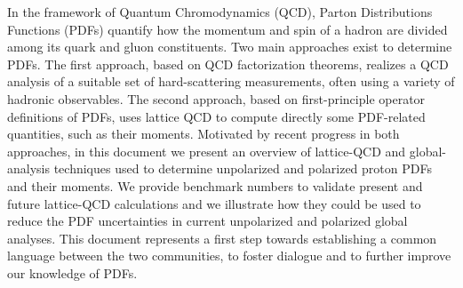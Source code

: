 \documentclass[twoside,12pt]{article}
\numberwithin{equation}{section}
\numberwithin{figure}{section}
\numberwithin{table}{section}
\begin{document}
\vspace{-0.4cm}
In the framework of Quantum Chromodynamics (QCD), Parton Distributions 
Functions (PDFs) quantify how the momentum and spin of a hadron are divided 
among its quark and gluon constituents.
%
Two main approaches exist to determine PDFs.
%
The first approach, based on QCD factorization theorems, realizes a QCD 
analysis of a suitable set of hard-scattering measurements, often using a 
variety of hadronic observables.
%
The second approach, based on first-principle operator definitions of PDFs,
uses lattice QCD to compute directly some PDF-related quantities, such 
as their moments.
%
Motivated by recent progress in both approaches, in this document we present
an overview of lattice-QCD and global-analysis techniques used to 
determine unpolarized and polarized proton PDFs and their moments. 
%
We provide benchmark numbers to validate present and future lattice-QCD 
calculations and we illustrate how they could be used to reduce
the PDF uncertainties in current unpolarized and polarized global analyses.
%
This document represents a first step towards establishing a common
language between the two communities, to foster dialogue and
to further improve our knowledge of PDFs.
\vspace{-0.5cm}

\tableofcontents













\appendix




\clearpage %


\clearpage %

\newpage %

\end{document}
